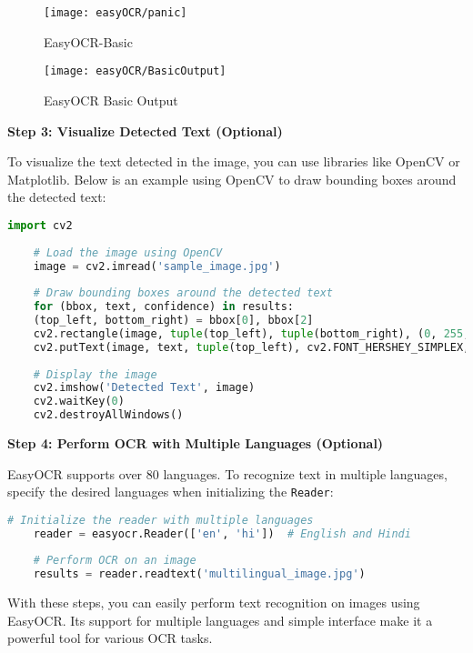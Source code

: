 \begin{figure}[h]
	\centering
	\texttt{[image: easyOCR/panic]}
	\caption{EasyOCR-Basic}\label{EasyOCR-Basic}
\end{figure}

\begin{figure}[h]
	\centering
	\texttt{[image: easyOCR/BasicOutput]}
	\caption{EasyOCR Basic Output}\label{EasyOCR Basic Output}
\end{figure}

\textbf{Step 3: Visualize Detected Text (Optional)} 

To visualize the text detected in the image, you can use libraries like OpenCV or Matplotlib. Below is an example using OpenCV to draw bounding boxes around the detected text:

\begin{lstlisting}[language=Python, caption=Visualizing Detected Text with OpenCV]
	import cv2
	
	# Load the image using OpenCV
	image = cv2.imread('sample_image.jpg')
	
	# Draw bounding boxes around the detected text
	for (bbox, text, confidence) in results:
	(top_left, bottom_right) = bbox[0], bbox[2]
	cv2.rectangle(image, tuple(top_left), tuple(bottom_right), (0, 255, 0), 2)
	cv2.putText(image, text, tuple(top_left), cv2.FONT_HERSHEY_SIMPLEX, 0.8, (255, 0, 0), 2)
	
	# Display the image
	cv2.imshow('Detected Text', image)
	cv2.waitKey(0)
	cv2.destroyAllWindows()
\end{lstlisting}

\textbf{Step 4: Perform OCR with Multiple Languages (Optional)} 

EasyOCR supports over 80 languages. To recognize text in multiple languages, specify the desired languages when initializing the \texttt{Reader}:

\begin{lstlisting}[language=Python, caption=Using Multiple Languages in EasyOCR]
	# Initialize the reader with multiple languages
	reader = easyocr.Reader(['en', 'hi'])  # English and Hindi
	
	# Perform OCR on an image
	results = reader.readtext('multilingual_image.jpg')
\end{lstlisting}

 With these steps, you can easily perform text recognition on images using EasyOCR. Its support for multiple languages and simple interface make it a powerful tool for various OCR tasks.\cite{Mahajan:2023} 



